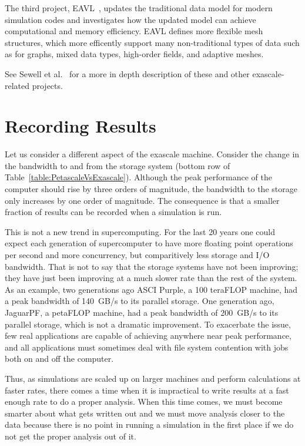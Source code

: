 \documentclass[conference]{IEEEtran}
\newcommand*{\lcite}[1]{~\cite{#1}}
\newcommand*{\scite}[1]{~\cite{#1}}
\newcommand{\etal}{et al.}
\begin{document}
The third project, EAVL\lcite{EAVL}, updates the traditional data model for
modern simulation codes and investigates how the updated model can achieve
computational and memory efficiency.  EAVL defines more flexible mesh
structures, which more efficently support many non-traditional types of
data such as for graphs, mixed data types, high-order fields, and adaptive
meshes.

See Sewell \etal\scite{Sewell2012} for a more in depth description of these
and other exascale-related projects.

\section{Recording Results}
\label{sec:RecordingResults}

\noindent
Let us consider a different aspect of the exascale machine.  Consider the
change in the bandwidth to and from the storage system (bottom row of
Table~\ref{table:PetascaleVsExascale}).  Although the peak performance of
the computer should rise by three orders of magnitude, the bandwidth to the
storage only increases by one order of magnitude.  The consequence is that
a smaller fraction of results can be recorded when a simulation is run.

This is not a new trend in supercomputing.  For the last 20 years one could
expect each generation of supercomputer to have more floating point
operations per second and more concurrency, but comparitively less storage
and I/O bandwidth.  That is not to say that the storage systems have not
been improving; they have just been improving at a much slower rate than
the rest of the system.  As an example, two generations ago ASCI Purple, a
100 teraFLOP machine, had a peak bandwidth of 140~GB/s to its parallel
storage.  One generation ago, JaguarPF, a petaFLOP machine, had a peak
bandwidth of 200~GB/s to its parallel storage, which is not a dramatic
improvement.  To exacerbate the issue, few real applications are capable of
achieving anywhere near peak performance, and all applications must
sometimes deal with file system contention with jobs both on and off the
computer.

Thus, as simulations are scaled up on larger machines and perform
calculations at faster rates, there comes a time when it is impractical to
write results at a fast enough rate to do a proper analysis.  When this
time comes, we must become smarter about what gets written out and we must
move analysis closer to the data because there is no point in running a
simulation in the first place if we do not get the proper analysis out of
it.
\end{document}
